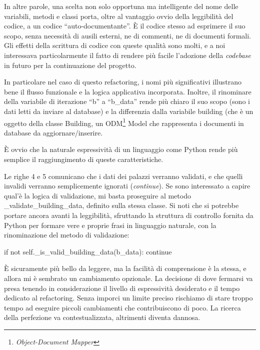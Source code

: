 \documentclass[12pt]{report}
\begin{document}
In altre parole, una scelta non solo opportuna ma intelligente del nome delle
variabili, metodi e classi porta, oltre al vantaggio ovvio della leggibilità
del codice, a un codice ``auto-documentante''. È il codice stesso ad esprimere
il suo scopo, senza necessità di ausili esterni, ne di commenti, ne di documenti
formali. Gli effetti della scrittura di codice con queste qualità sono molti, 
e a noi interessava particolarmente il fatto di rendere più facile l'adozione
della \textit{codebase} in futuro per la continuazione del progetto.

In particolare nel caso di questo refactoring, i nomi più significativi
illustrano bene il flusso funzionale e la logica applicativa incorporata.
Inoltre, il rinominare della variabile di iterazione ``b'' a ``b\_data'' rende
più chiaro il suo scopo (sono i dati letti da inviare al database) 
e la differenzia dalla variabile building (che è un oggetto della
classe Building, un ODM\footnote{\textit{Object-Document Mapper}} Model che
rappresenta i documenti in database da aggiornare/inserire. 

È ovvio che la naturale espressività di un linguaggio come Python rende
più semplice il raggiungimento di queste caratteristiche. 

Le righe 4 e 5 comunicano che i dati dei palazzi verranno validati, 
e che quelli invalidi verranno semplicemente ignorati (\textit{continue}). 
Se sono interessato a capire qual'è la logica di validazione, mi basta
proseguire al metodo \_validate\_building\_data, definito 
sulla stessa classe. Si noti che si potrebbe portare ancora avanti 
la leggibilità, sfruttando la struttura di controllo fornita da Python 
per formare vere e proprie frasi in linguaggio naturale, con la 
rinominazione del metodo di validazione:

\begin{python}
if not self._is_valid_building_data(b_data):
    continue
\end{python}

È sicuramente più bello da leggere, ma la facilità di comprensione è la stessa,
e allora mi è sembrato un cambiamento opzionale. La decisione di dove fermarsi
va presa tenendo in considerazione il livello di espressività desiderato
e il tempo dedicato al refactoring. Senza imporci un limite preciso rischiamo
di stare troppo tempo ad eseguire piccoli cambiamenti che contribuiscono
di poco. La ricerca della perfezione va contestualizzata, altrimenti diventa
dannosa.
\end{document}
